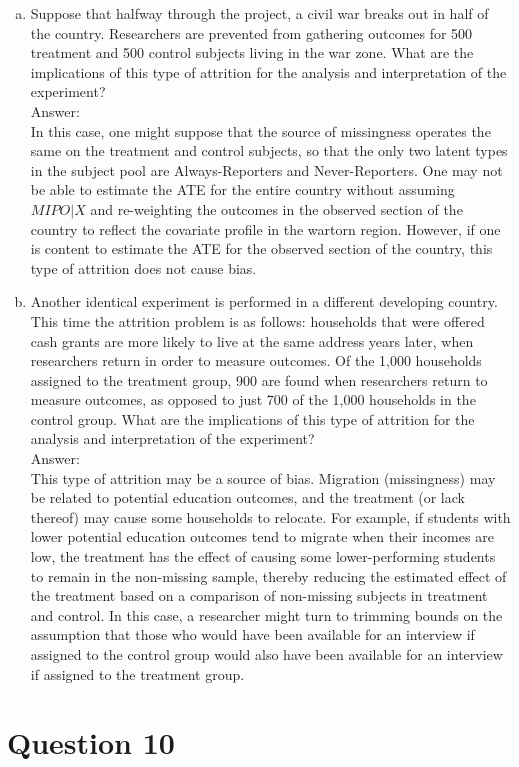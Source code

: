 \documentclass[11pt,notitlepage]{article}\usepackage[]{graphicx}\usepackage[]{color}
\makeatletter
\newenvironment{kframe}{%
 \def\at@end@of@kframe{}%
 \ifinner\ifhmode%
  \def\at@end@of@kframe{\end{minipage}}%
  \begin{minipage}{\columnwidth}%
 \fi\fi%
 \def\FrameCommand##1{\hskip\@totalleftmargin \hskip-\fboxsep
 \colorbox{shadecolor}{##1}\hskip-\fboxsep
     \hskip-\linewidth \hskip-\@totalleftmargin \hskip\columnwidth}%
 \MakeFramed {\advance\hsize-\width
   \@totalleftmargin\z@ \linewidth\hsize
   \@setminipage}}%
 {\par\unskip\endMakeFramed%
 \at@end@of@kframe}
\newenvironment{knitrout}{}{} %
\makeatother
\begin{document}
\begin{enumerate}[a)]
\item Suppose that halfway through the project, a civil war breaks out in half of the country. Researchers are prevented from gathering outcomes for 500 treatment and 500 control subjects living in the war zone. What are the implications of this type of attrition for the analysis and interpretation of the experiment?\\
Answer:\\
In this case, one might suppose that the source of missingness operates the same on the treatment and control subjects, so that the only two latent types in the subject pool are Always-Reporters and Never-Reporters. One may not be able to estimate the ATE for the entire country without assuming $MIPO|X$ and re-weighting the outcomes in the observed section of the country to reflect the covariate profile in the wartorn region. However, if one is content to estimate the ATE for the observed section of the country, this type of attrition does not cause bias.

\item Another identical experiment is performed in a different developing country. This time the attrition problem is as follows: households that were offered cash grants are more likely to live at the same address years later, when researchers return in order to measure outcomes. Of the 1,000 households assigned to the treatment group, 900 are found when researchers return to measure outcomes, as opposed to just 700 of the 1,000 households in the control group. What are the implications of this type of attrition for the analysis and interpretation of the experiment?\\
Answer:\\
This type of attrition may be a source of bias. Migration (missingness) may be related to potential education outcomes, and the treatment (or lack thereof) may cause some households to relocate. For example, if students with lower potential education outcomes tend to migrate when their incomes are low, the treatment has the effect of causing some lower-performing students to remain in the non-missing sample, thereby reducing the estimated effect of the treatment based on a comparison of non-missing subjects in treatment and control. In this case, a researcher might turn to trimming bounds on the assumption that those who would have been available for an interview if assigned to the control group would also have been available for an interview if assigned to the treatment group.
\end{enumerate}

\section*{Question 10}
\begin{knitrout}
\color{fgcolor}\begin{kframe}
\begin{verbatim}





\end{verbatim}
\end{kframe}
\end{knitrout}
\end{document}
